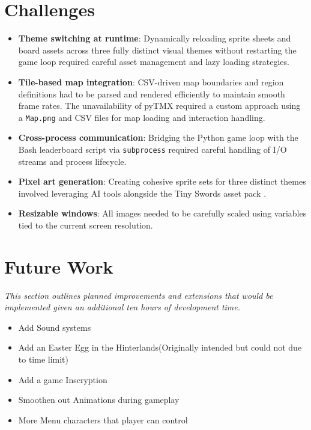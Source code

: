 \documentclass[12pt, a4paper]{article}
\begin{document}
\section{Challenges}

\begin{itemize}
    \item \textbf{Theme switching at runtime}: Dynamically reloading sprite sheets and board assets across three fully distinct visual themes without restarting the game loop required careful asset management and lazy loading strategies.
    \item \textbf{Tile-based map integration}: CSV-driven map boundaries and region definitions had to be parsed and rendered efficiently to maintain smooth frame rates. The unavailability of pyTMX required a custom approach using a \texttt{Map.png} and CSV files for map loading and interaction handling.
    \item \textbf{Cross-process communication}: Bridging the Python game loop with the Bash leaderboard script via \texttt{subprocess} required careful handling of I/O streams and process lifecycle.
    \item \textbf{Pixel art generation}: Creating cohesive sprite sets for three distinct themes involved leveraging AI tools alongside the Tiny Swords asset pack \cite{tinyswords}.
    \item \textbf{Resizable windows}: All images needed to be carefully scaled using variables tied to the current screen resolution.
\end{itemize}

\section{Future Work}
\label{sec:futurework}

\textit{This section outlines planned improvements and extensions that would be implemented given an additional ten hours of development time.}

\begin{itemize}
    \item Add Sound systems
    \item Add an Easter Egg in the Hinterlands(Originally intended but could not due to time limit)
    \item Add a game Inscryption
    \item Smoothen out Animations during gameplay
    \item More Menu characters that player can control
\end{itemize}
\end{document}
